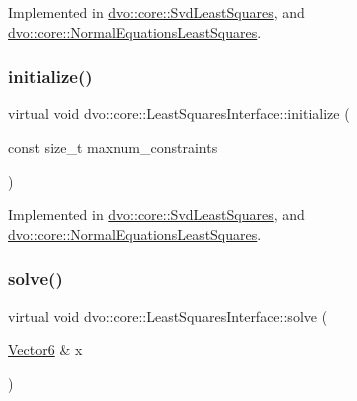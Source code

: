 Implemented in \mbox{\hyperlink{classdvo_1_1core_1_1_svd_least_squares_ac91cb5c82af6eb9d91d3ef4e85dc76a3}{dvo\+::core\+::\+Svd\+Least\+Squares}}, and \mbox{\hyperlink{classdvo_1_1core_1_1_normal_equations_least_squares_a0da5301414f684b8e3ebfa9c4794af31}{dvo\+::core\+::\+Normal\+Equations\+Least\+Squares}}.

\mbox{\label{classdvo_1_1core_1_1_least_squares_interface_a09e5784f74d7352a9550a8aa523d30d7}} 
\subsubsection{\texorpdfstring{initialize()}{initialize()}}
{\footnotesize\ttfamily virtual void dvo\+::core\+::\+Least\+Squares\+Interface\+::initialize (\begin{DoxyParamCaption}\item[{const size\+\_\+t}]{maxnum\+\_\+constraints }\end{DoxyParamCaption})\hspace{0.3cm}{\ttfamily [pure virtual]}}



Implemented in \mbox{\hyperlink{classdvo_1_1core_1_1_svd_least_squares_aa09756d97cb63e8dc8276a88a1a07791}{dvo\+::core\+::\+Svd\+Least\+Squares}}, and \mbox{\hyperlink{classdvo_1_1core_1_1_normal_equations_least_squares_a4799d66e3dc176ab07418fc1cfacfb53}{dvo\+::core\+::\+Normal\+Equations\+Least\+Squares}}.

\mbox{\label{classdvo_1_1core_1_1_least_squares_interface_a3e2b3c894c5286fdee79316e6fa4d691}} 
\subsubsection{\texorpdfstring{solve()}{solve()}}
{\footnotesize\ttfamily virtual void dvo\+::core\+::\+Least\+Squares\+Interface\+::solve (\begin{DoxyParamCaption}\item[{\mbox{\hyperlink{namespacedvo_1_1core_a05327f3312d32a301bce9fccda9e5807}{Vector6}} \&}]{x }\end{DoxyParamCaption})\hspace{0.3cm}{\ttfamily [pure virtual]}}



